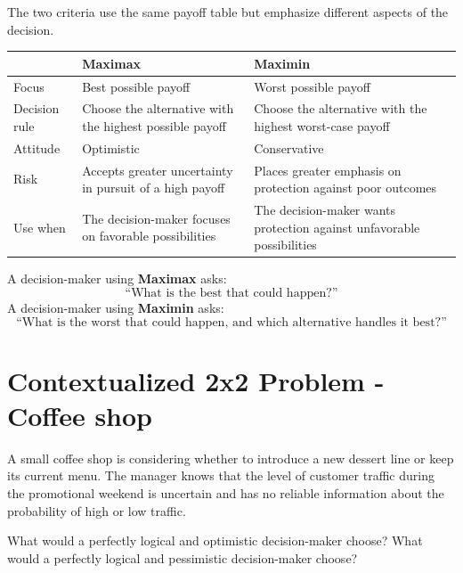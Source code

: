 	The two criteria use the same payoff table but emphasize different
	aspects of the decision.
	\begin{center}
		\renewcommand{\arraystretch}{1.5}
		\begin{tabular}{p{}p{}p{}}
			\toprule
			& \textbf{Maximax} & \textbf{Maximin} \\
			\midrule
			
			Focus
			&
			Best possible payoff
			&
			Worst possible payoff
			\\
			
			Decision rule
			&
			Choose the alternative with the highest possible payoff
			&
			Choose the alternative with the highest worst-case payoff
			\\
			
			Attitude
			&
			Optimistic
			&
			Conservative
			\\
			
			Risk
			&
			Accepts greater uncertainty in pursuit of a high payoff
			&
			Places greater emphasis on protection against poor outcomes
			\\
			
			Use when
			&
			The decision-maker focuses on favorable possibilities
			&
			The decision-maker wants protection against unfavorable possibilities
			\\
			
			\bottomrule
		\end{tabular}
	\end{center}
	
	A decision-maker using \textbf{Maximax} asks:
	\[
	\text{``What is the best that could happen?''}
	\]
	A decision-maker using \textbf{Maximin} asks:
	\[
	\text{``What is the worst that could happen, and which alternative
		handles it best?''}
	\]
	
	\section{Contextualized 2x2 Problem - Coffee shop}
	
	A small coffee shop is considering whether to introduce a new dessert line or keep its current menu. The manager knows that the level of customer traffic during the promotional weekend is uncertain and has no reliable information about the probability of high or low traffic.
	
	What would a perfectly logical and optimistic decision-maker choose? What would a perfectly logical and pessimistic decision-maker choose?
	
